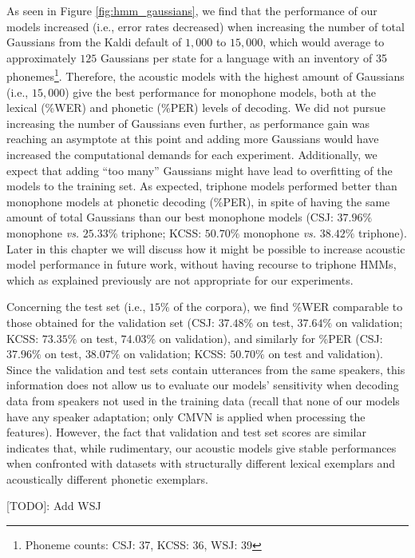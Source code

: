 As seen in Figure \ref{fig:hmm_gaussians}, we find that the performance of our models increased (i.e., error rates decreased) when increasing the number of total Gaussians from the Kaldi default of $1,000$ to $15,000$, which would average to approximately $125$ Gaussians per state for a language with an inventory of 35 phonemes\footnote{Phoneme counts: CSJ: 37, KCSS: 36, WSJ: 39}.   
Therefore, the acoustic models with the highest amount of Gaussians (i.e., $15,000$) give the best performance for monophone models, both at the lexical (\%WER) and phonetic (\%PER) levels of decoding.
We did not pursue increasing the number of Gaussians even further, as performance gain was reaching an asymptote at this point and adding more Gaussians would have increased the computational demands for each experiment. Additionally, we expect that adding ``too many'' Gaussians might have lead to overfitting of the models to the training set.
As expected, triphone models performed better than monophone models at phonetic decoding (\%PER), in spite of having the same amount of total Gaussians than our best monophone models (CSJ: $37.96\%$ monophone \textit{vs.} $25.33\%$ triphone; KCSS: $50.70\%$ monophone \textit{vs.} $38.42\%$ triphone). Later in this chapter we will discuss how it might be possible to increase acoustic model performance in future work, without having recourse to triphone HMMs, which as explained previously are not appropriate for our experiments.  

Concerning the test set (i.e., $15\%$ of the corpora), we find \%WER comparable to those obtained for the validation set (CSJ: $37.48\%$ on test, $37.64\%$ on validation; KCSS: $73.35\%$ on test, $74.03\%$ on validation), and similarly for \%PER (CSJ: $37.96\%$ on test, $38.07\%$ on validation; KCSS: $50.70\%$ on test and validation).
Since the validation and test sets contain utterances from the same speakers, this information does not allow us to evaluate our models' sensitivity when decoding data from speakers not used in the training data (recall that none of our models have any speaker adaptation; only CMVN is applied when processing the features). However, the fact that validation and test set scores are similar indicates that, while rudimentary, our acoustic models give stable performances when confronted with datasets with structurally different lexical exemplars and acoustically different phonetic exemplars.   

{\color{red}[TODO]: Add WSJ}

